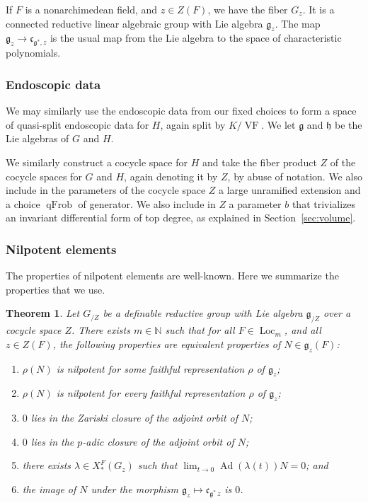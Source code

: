 \documentclass[12pt]{amsart}
\newcommand{\op}[1]{\operatorname{#1}}
\newcommand{\ring}[1]{{\mathbb #1}}
\def\VF{{\op{VF}}}
\newcommand{\fg}{\mathfrak{g}}
\newcommand{\fc}{\mathfrak{c}}
\newcommand{\fh}{\mathfrak{h}}
\theoremstyle{plain}
\newtheorem{theorem}[thm]{Theorem}
\theoremstyle{definition}
\begin{document}
If $F$ is a nonarchimedean field, and $z\in Z(F)$, we have the fiber
$G_z$.  It is a connected reductive linear algebraic group with Lie
algebra $\fg_z$.  The map $\fg_z\to \fc_{\fg^{*},z}$ is the usual map
from the Lie algebra to the space of characteristic polynomials.

\subsubsection{Endoscopic data}

We may similarly use the endoscopic data from our fixed choices to form
a space of quasi-split endoscopic data for $H$, again split by $K/\VF$.  
We let $\fg$ and $\fh$ be the Lie algebras of $G$ and $H$.

We
similarly construct a cocycle space for $H$ and take the fiber product
$Z$ of the cocycle spaces for $G$ and $H$, again denoting it by $Z$,
by abuse of notation.  We also include in the parameters of
the cocycle space $Z$ a large unramified extension and a choice
$\op{qFrob}$ of generator.
We also
include in $Z$ a parameter $b$ that trivializes an invariant
differential form of top degree, as explained in Section~\ref{sec:volume}.




\subsubsection{Nilpotent elements}\label{sec:nilpotent}

The properties of nilpotent elements are well-known.  Here we
summarize the properties that we use.

\begin{theorem} 
  Let $G_{/Z}$ be a definable reductive group with Lie algebra
  $\fg_{/Z}$ over a cocycle space $Z$.  There exists $m\in\ring{N}$
  such that for all $F\in\op{Loc}_m$, and all $z\in Z(F)$, the
  following properties are equivalent properties of $N\in \fg_z(F)$:
\begin{enumerate}
\item $\rho(N)$ is nilpotent for {\it some} faithful representation $\rho$
 of  $\fg_z$;
\item $\rho(N)$ is nilpotent for {\it every} faithful representation $\rho$
 of  $\fg_z$;
\item $0$ lies in the Zariski closure of the adjoint orbit of $N$;
\item $0$ lies in the $p$-adic closure of the adjoint orbit of $N$;
\item there exists $\lambda\in X_*^F(G_z)$ such that $\lim_{t\to 0}
  \op{Ad}(\lambda(t))N = 0$; and
\item the image of $N$ under the morphism $\fg_z\mapsto \fc_{\fg^*\,z}$
  is $0$.
\end{enumerate}
\end{theorem}
\end{document}
